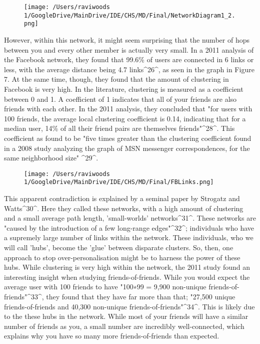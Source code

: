 \documentclass[]{article}
\begin{document}
\begin{figure}
\centering
\texttt{[image: /Users/raviwoods 1/GoogleDrive/MainDrive/IDE/CHS/MD/Final/NetworkDiagram1\_2.png]}
\caption{}
\end{figure}

However, within this network, it might seem surprising that the number
of hops between you and every other member is actually very small. In a
2011 analysis of the Facebook network, they found that 99.6\% of users
are connected in 6 links or less, with the average distance being 4.7
links\^{}26\^{}, as seen in the graph in Figure 7. At the same time,
though, they found that the amount of clustering in Facebook is very
high. In the literature, clustering is measured as a coefficient between
0 and 1. A coefficient of 1 indicates that all of your friends are also
friends with each other. In the 2011 analysis, they concluded that "for
users with 100 friends, the average local clustering coefficient is
0.14, indicating that for a median user, 14\% of all their friend pairs
are themselves friends"\^{}28\^{}. This coefficient as found to be "five
times greater than the clustering coefficient found in a 2008 study
analyzing the graph of MSN messenger correspondences, for the same
neighborhood size" \^{}29\^{}.

\begin{figure}
\centering
\texttt{[image: /Users/raviwoods 1/GoogleDrive/MainDrive/IDE/CHS/MD/Final/FBLinks.png]}
\caption{}
\end{figure}

This apparent contradiction is explained by a seminal paper by Strogatz
and Watts\^{}30\^{}. Here they called these networks, with a high amount
of clustering and a small average path length, 'small-worlds'
networks\^{}31\^{}. These networks are "caused by the introduction of a
few long-range edges"\^{}32\^{}; individuals who have a supremely large
number of links within the network. These individuals, who we will call
'hubs', become the 'glue' between disparate clusters. So, then, one
approach to stop over-personalisation might be to harness the power of
these hubs. While clustering is very high within the network, the 2011
study found an interesting insight when studying friends-of-friends.
While you would expect the average user with 100 friends to have "100∗99
= 9,900 non-unique friends-of-friends"\^{}33\^{}, they found that they
have far more than that; "27,500 unique friends-of-friends and 40,300
non-unique friends-of-friends"\^{}34\^{}. This is likely due to the
these hubs in the network. While most of your friends will have a
similar number of friends as you, a small number are incredibly
well-connected, which explains why you have so many more
friends-of-friends than expected.
\end{document}
